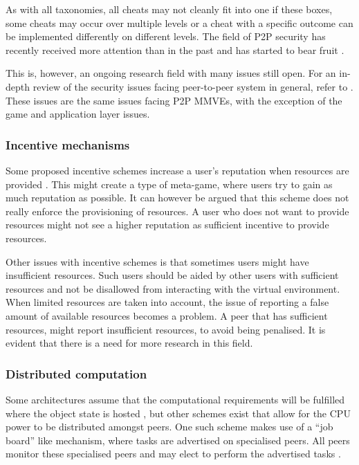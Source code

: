 As with all taxonomies, all cheats may not cleanly fit into one if these boxes, some cheats may occur over multiple levels or a cheat with a specific outcome can be implemented differently on different levels. The field of P2P security has recently received more attention than in the past and has started to bear fruit \cite{survey_p2p_game_cheats}.

This is, however, an ongoing research field with many issues still open. For an in-depth review of the security issues facing peer-to-peer system in general, refer to \cite{p2p_security_issues}. These issues are the same issues facing P2P MMVEs, with the exception of the game and application layer issues.

\subsubsection{Incentive mechanisms}

Some proposed incentive schemes increase a user's reputation when resources are provided  \cite{classic_p2p_reputation} \cite{proactive_reputation}. This might create a type of meta-game, where users try to gain as much reputation as possible. It can however be argued that this scheme does not really enforce the provisioning of resources. A user who does not want to provide resources might not see a higher reputation as sufficient incentive to provide resources.

Other issues with incentive schemes is that sometimes users might have insufficient resources. Such users should be aided by other users with sufficient resources and not be disallowed from interacting with the virtual environment. When limited resources are taken into account, the issue of reporting a false amount of available resources becomes a problem. A peer that has sufficient resources, might report insufficient resources, to avoid being penalised. It is evident that there is a need for more research in this field.

\subsubsection{Distributed computation}
\label{distributed_computing_challenge}

Some architectures assume that the computational requirements will be fulfilled where the object state is hosted \cite{solipsis}, but other schemes exist that allow for the CPU power to be distributed amongst peers. One such scheme makes use of a ``job board'' like mechanism, where tasks are advertised on specialised peers. All peers monitor these specialised peers and may elect to perform the advertised tasks \cite{fan_mediator_paper}.

